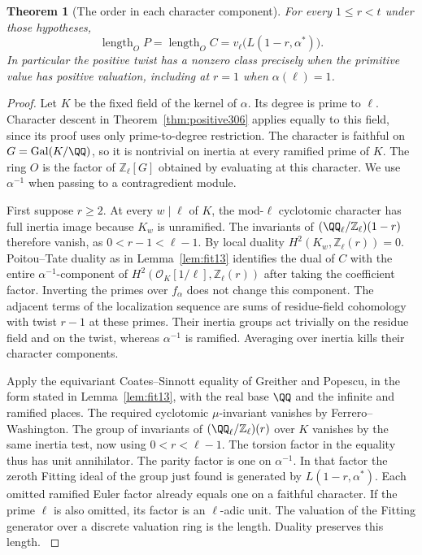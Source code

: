 \documentclass[a4paper,11pt]{article}
\newtheorem{theorem}[proposition]{Theorem}
\theoremstyle{definition}
\theoremstyle{remark}
\newcommand{\ZZ}{\mathbb Z}\newcommand{\ord}{\operatorname{ord}}
\numberwithin{equation}{section}
\begin{document}
\begin{theorem}[The order in each character component]\leavevmode
\label{thm:primitive307}
For every \(1\le r<t\) under those hypotheses,
\[
    \operatorname{length}_O P=\operatorname{length}_O C
                     =v_\ell\big(L(1-r,\alpha^*)\big).
\]
In particular the positive twist has a nonzero class precisely when
the primitive value has positive valuation, including at \(r=1\)
when \(\alpha(\ell)=1\).
\end{theorem}
\begin{proof}
Let \(K\) be the fixed field of the kernel of \(\alpha\).
Its degree is prime to \(\ell\). Character descent in
Theorem~\ref{thm:positive306} applies equally to this field,
since its proof uses only prime-to-degree restriction. The
character is faithful on \(G=\operatorname{Gal}(K/\QQ)\), so
it is nontrivial on inertia at every ramified prime of \(K\).
The ring \(O\) is the factor of \(\ZZ_\ell[G]\) obtained by
evaluating at this character. We use \(\alpha^{-1}\) when
passing to a contragredient module.

First suppose \(r\ge2\). At every \(w\mid\ell\) of \(K\),
the mod-\(\ell\) cyclotomic character has full inertia image
because \(K_w\) is unramified. The invariants of
\((\QQ_\ell/\ZZ_\ell)(1-r)\) therefore vanish, as
\(0<r-1<\ell-1\). By local duality
\(H^2(K_w,\ZZ_\ell(r))=0\). Poitou--Tate duality as in
Lemma~\ref{lem:fit13} identifies the dual of \(C\) with the
entire \(\alpha^{-1}\)-component of
\(H^2(\mathcal O_K[1/\ell],\ZZ_\ell(r))\) after taking
the coefficient factor. Inverting the primes over
\(f_\alpha\) does not change this component. The adjacent
terms of the localization sequence are sums of residue-field
cohomology with twist \(r-1\) at these primes. Their inertia
groups act trivially on the residue field and on the twist,
whereas \(\alpha^{-1}\) is ramified. Averaging over inertia
kills their character components.

Apply the equivariant Coates--Sinnott equality of Greither
and Popescu, in the form stated in Lemma~\ref{lem:fit13},
with the real base \(\QQ\) and the infinite and ramified
places. The required cyclotomic \(\mu\)-invariant vanishes
by Ferrero--Washington. The group of invariants of
\((\QQ_\ell/\ZZ_\ell)(r)\) over \(K\) vanishes by the same
inertia test, now using \(0<r<\ell-1\). The torsion factor in
the equality thus has unit annihilator. The parity factor
is one on \(\alpha^{-1}\). In that factor the zeroth Fitting
ideal of the group just found is generated by
\(L(1-r,\alpha^*)\). Each omitted ramified Euler factor
already equals one on a faithful character. If the prime
\(\ell\) is also omitted, its factor is an \(\ell\)-adic unit.
The valuation of the Fitting generator over a discrete
valuation ring is the length. Duality preserves this length.
\cite[Theorem 6.11]{V-III-II-gp13}


\end{proof}
\end{document}
